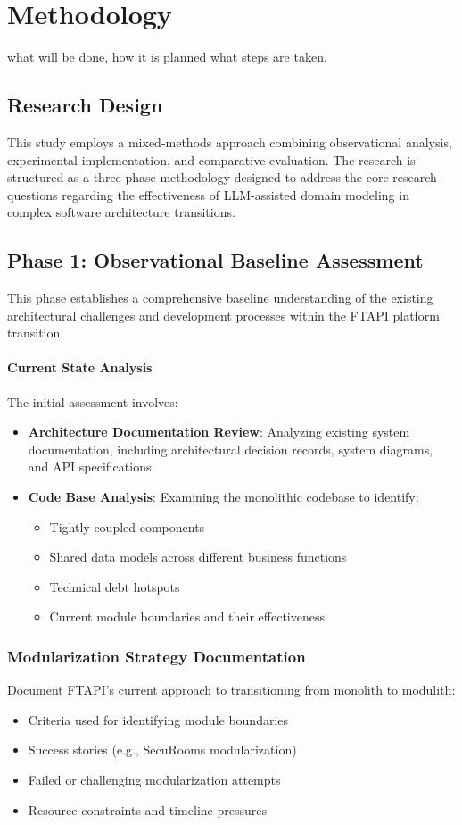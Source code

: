 \chapter{Methodology}
what will be done, how it is planned what steps are taken.
\section{Research Design}
This study employs a mixed-methods approach combining observational analysis, experimental implementation, and comparative evaluation. The research is structured as a three-phase methodology designed to address the core research questions regarding the effectiveness of LLM-assisted domain modeling in complex software architecture transitions.
\section{Phase 1: Observational Baseline Assessment}
This phase establishes a comprehensive baseline understanding of the existing architectural challenges and development processes within the FTAPI platform transition.

\subsubsection{Current State Analysis}
The initial assessment involves:
\begin{itemize}
    \item \textbf{Architecture Documentation Review}: Analyzing existing system documentation, including architectural decision records, system diagrams, and API specifications
    \item \textbf{Code Base Analysis}: Examining the monolithic codebase to identify:
    \begin{itemize}
        \item Tightly coupled components
        \item Shared data models across different business functions
        \item Technical debt hotspots
        \item Current module boundaries and their effectiveness
    \end{itemize}
\end{itemize}

\subsection{Modularization Strategy Documentation}
Document FTAPI's current approach to transitioning from monolith to modulith:
\begin{itemize}
    \item Criteria used for identifying module boundaries
    \item Success stories (e.g., SecuRooms modularization)
    \item Failed or challenging modularization attempts
    \item Resource constraints and timeline pressures
\end{itemize}

